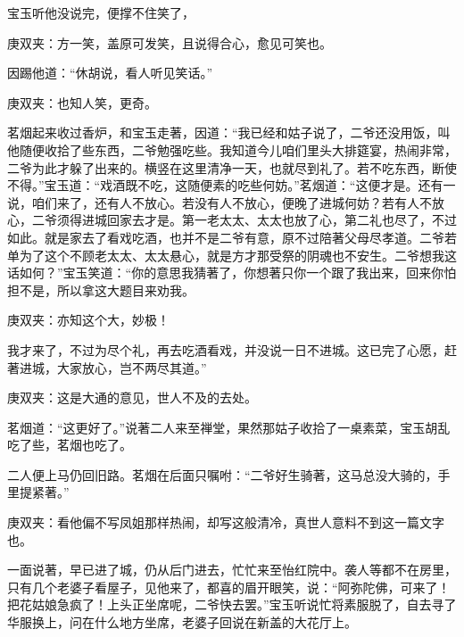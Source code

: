 \begin{parag}
    宝玉听他没说完，便撑不住笑了，\begin{note}庚双夹：方一笑，盖原可发笑，且说得合心，愈见可笑也。\end{note}因踢他道：“休胡说，看人听见笑话。”\begin{note}庚双夹：也知人笑，更奇。\end{note}茗烟起来收过香炉，和宝玉走著，因道：“我已经和姑子说了，二爷还没用饭，叫他随便收拾了些东西，二爷勉强吃些。我知道今儿咱们里头大排筵宴，热闹非常，二爷为此才躲了出来的。横竖在这里清净一天，也就尽到礼了。若不吃东西，断使不得。”宝玉道：“戏酒既不吃，这随便素的吃些何妨。”茗烟道：“这便才是。还有一说，咱们来了，还有人不放心。若没有人不放心，便晚了进城何妨？若有人不放心，二爷须得进城回家去才是。第一老太太、太太也放了心，第二礼也尽了，不过如此。就是家去了看戏吃酒，也并不是二爷有意，原不过陪著父母尽孝道。二爷若单为了这个不顾老太太、太太悬心，就是方才那受祭的阴魂也不安生。二爷想我这话如何？”宝玉笑道：“你的意思我猜著了，你想著只你一个跟了我出来，回来你怕担不是，所以拿这大题目来劝我。\begin{note}庚双夹：亦知这个大，妙极！\end{note}我才来了，不过为尽个礼，再去吃酒看戏，并没说一日不进城。这已完了心愿，赶著进城，大家放心，岂不两尽其道。”\begin{note}庚双夹：这是大通的意见，世人不及的去处。\end{note}茗烟道：“这更好了。”说著二人来至禅堂，果然那姑子收拾了一桌素菜，宝玉胡乱吃了些，茗烟也吃了。
\end{parag}


\begin{parag}
    二人便上马仍回旧路。茗烟在后面只嘱咐：“二爷好生骑著，这马总没大骑的，手里提紧著。”\begin{note}庚双夹：看他偏不写凤姐那样热闹，却写这般清冷，真世人意料不到这一篇文字也。\end{note}一面说著，早已进了城，仍从后门进去，忙忙来至怡红院中。袭人等都不在房里，只有几个老婆子看屋子，见他来了，都喜的眉开眼笑，说：“阿弥陀佛，可来了！把花姑娘急疯了！上头正坐席呢，二爷快去罢。”宝玉听说忙将素服脱了，自去寻了华服换上，问在什么地方坐席，老婆子回说在新盖的大花厅上。
\end{parag}


